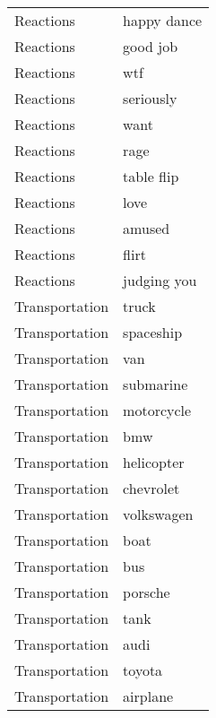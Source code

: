 \begin{supertabular}{l p{0.25\textwidth}}
        Reactions &                        happy dance \\
        Reactions &                           good job \\
        Reactions &                                wtf \\
        Reactions &                          seriously \\
        Reactions &                               want \\
        Reactions &                               rage \\
        Reactions &                         table flip \\
        Reactions &                               love \\
        Reactions &                             amused \\
        Reactions &                              flirt \\
        Reactions &                        judging you \\
   Transportation &                              truck \\
   Transportation &                          spaceship \\
   Transportation &                                van \\
   Transportation &                          submarine \\
   Transportation &                         motorcycle \\
   Transportation &                                bmw \\
   Transportation &                         helicopter \\
   Transportation &                          chevrolet \\
   Transportation &                         volkswagen \\
   Transportation &                               boat \\
   Transportation &                                bus \\
   Transportation &                            porsche \\
   Transportation &                               tank \\
   Transportation &                               audi \\
   Transportation &                             toyota \\
   Transportation &                           airplane \\

\end{supertabular}
